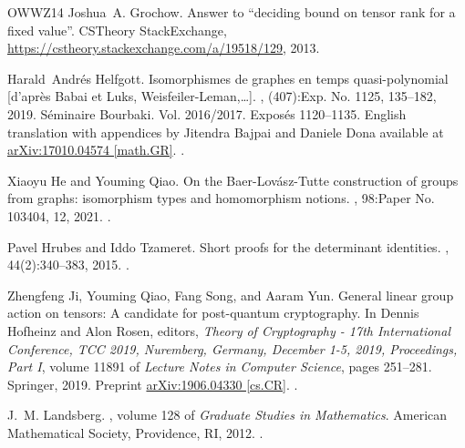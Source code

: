 \documentclass[10pt,a4paper]{article}
\theoremstyle{definition}
\begin{document}
\begin{thebibliography}{OWWZ14}
Joshua~A. Grochow.
\newblock Answer to ``deciding bound on tensor rank for a fixed value''.
\newblock CSTheory StackExchange,
  \href{https://cstheory.stackexchange.com/a/19518/129}{https://cstheory.stackexchange.com/a/19518/129},
  2013.

Harald~Andr\'{e}s Helfgott.
\newblock Isomorphismes de graphes en temps quasi-polynomial [d'apr\`es {B}abai
  et {L}uks, {W}eisfeiler-{L}eman,\dots ].
, (407):Exp. No. 1125, 135--182, 2019.
\newblock S\'{e}minaire Bourbaki. Vol. 2016/2017. Expos\'{e}s 1120--1135.
  English translation with appendices by Jitendra Bajpai and Daniele Dona
  available at \href{https://arxiv.org/abs/1710.04574}{arXiv:17010.04574
  [math.GR]}.
\newblock \href {https://doi.org/10.24033/ast} {}.

Xiaoyu He and Youming Qiao.
\newblock On the {B}aer-{L}ov\'{a}sz-{T}utte construction of groups from
  graphs: isomorphism types and homomorphism notions.
, 98:Paper No. 103404, 12, 2021.
\newblock \href {https://doi.org/10.1016/j.ejc.2021.103404}
  {}.

Pavel Hrubes and Iddo Tzameret.
\newblock Short proofs for the determinant identities.
, 44(2):340--383, 2015.
\newblock \href {https://doi.org/10.1137/130917788}
  {}.

Zhengfeng Ji, Youming Qiao, Fang Song, and Aaram Yun.
\newblock General linear group action on tensors: {A} candidate for
  post-quantum cryptography.
\newblock In Dennis Hofheinz and Alon Rosen, editors, {\em Theory of
  Cryptography - 17th International Conference, {TCC} 2019, Nuremberg, Germany,
  December 1-5, 2019, Proceedings, Part {I}}, volume 11891 of {\em Lecture
  Notes in Computer Science}, pages 251--281. Springer, 2019.
\newblock Preprint \href{https://arxiv.org/abs/1906.04330}{arXiv:1906.04330
  [cs.CR]}.
\newblock \href {https://doi.org/10.1007/978-3-030-36030-6\_11}
  {}.

J.~M. Landsberg.
, volume 128 of {\em Graduate
  Studies in Mathematics}.
\newblock American Mathematical Society, Providence, RI, 2012.
\newblock \href {https://doi.org/10.1090/gsm/128} {}.


\end{thebibliography}
\end{document}
